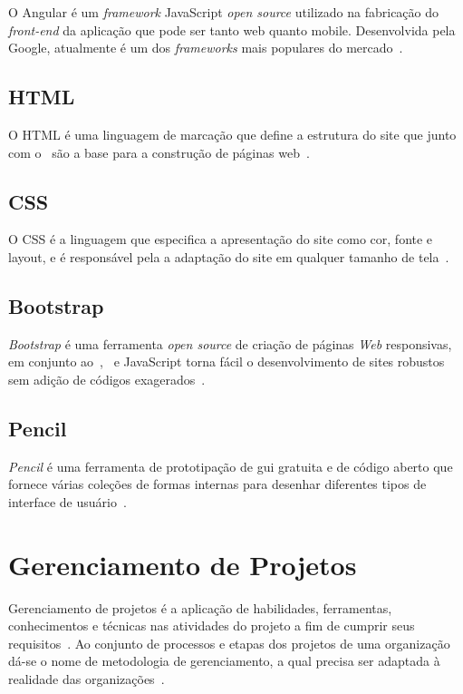 O Angular é um \textit{framework} JavaScript \textit{open source} utilizado na fabricação do \textit{front-end} da aplicação que pode ser tanto web quanto mobile. 
Desenvolvida pela Google, atualmente é um dos \textit{frameworks} mais populares do mercado~\citep{costa2017email}.

\subsection{HTML}\label{html}
\indent

O \acf{HTML} é uma linguagem de marcação que define a estrutura do site que junto com o~ são a base para a construção de páginas web~\citep{w3c}.

\subsection{CSS}\label{css}
\indent

O \acf{CSS} é a linguagem que especifica a apresentação do site como cor, fonte e layout, e é responsável pela a adaptação do site em qualquer tamanho de tela~\citep{w3c}.

\subsection{Bootstrap}\label{bootstrap}
\indent

\textit{Bootstrap} é uma ferramenta \textit{open source} de criação de páginas \textit{Web} responsivas, em conjunto ao~,~ e JavaScript torna fácil o desenvolvimento de sites robustos sem adição de códigos exagerados~\citep{2013bootstrap}.

\subsection{Pencil}
\indent

\textit{Pencil} é uma ferramenta de prototipação de \acf{gui} gratuita e de código aberto que fornece várias coleções de formas internas para desenhar diferentes tipos de interface de usuário~\citep{pencil}.


\section{Gerenciamento de Projetos}\label{GerProj}
\indent

Gerenciamento de projetos é a aplicação de habilidades, ferramentas, conhecimentos e técnicas nas atividades do projeto a fim de cumprir seus requisitos~\citep{pmbok}. 
Ao conjunto de processos e etapas dos projetos de uma organização dá-se o nome de metodologia de gerenciamento, a qual precisa ser adaptada à realidade das organizações~\citep{xavier2005metodologia}.

